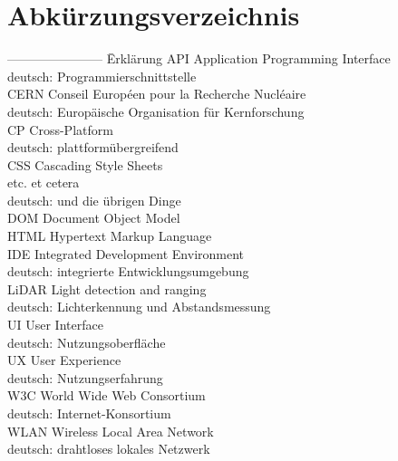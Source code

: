 \documentclass[a4paper]{scrartcl}
\begin{document}
\newpage

\section*{Abkürzungsverzeichnis}


\begin{tabbing}
	----------------------- \= Erklärung \kill
	API \> Application Programming Interface \\
	\> deutsch: Programmierschnittstelle \\
	CERN \> Conseil Européen pour la Recherche Nucléaire \\
	\> deutsch: Europäische Organisation für Kernforschung \\
	CP \> Cross-Platform \\
	\> deutsch: plattformübergreifend \\
	CSS \> Cascading Style Sheets \\
	etc. \> et cetera \\
	\> deutsch: und die übrigen Dinge \\
	DOM \> Document Object Model \\
	HTML \> Hypertext Markup Language \\
	IDE \> Integrated Development Environment \\
	\> deutsch: integrierte Entwicklungsumgebung \\
	LiDAR \> Light detection and ranging \\
	\> deutsch: Lichterkennung und Abstandsmessung \\
	UI \> User Interface \\
	\> deutsch: Nutzungsoberfläche \\
	UX \> User Experience \\
	\> deutsch: Nutzungserfahrung \\
	W3C \> World Wide Web Consortium \\
	\> deutsch: Internet-Konsortium \\
	WLAN \> Wireless Local Area Network \\
	\> deutsch: drahtloses lokales Netzwerk \\
	
\end{tabbing}


\newpage
\end{document}

